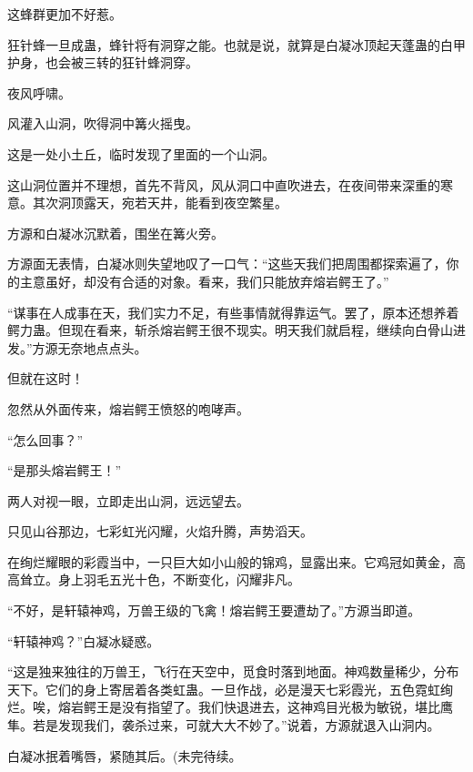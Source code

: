\begin{this_body}
这蜂群更加不好惹。

狂针蜂一旦成蛊，蜂针将有洞穿之能。也就是说，就算是白凝冰顶起天蓬蛊的白甲护身，也会被三转的狂针蜂洞穿。

夜风呼啸。

风灌入山洞，吹得洞中篝火摇曳。

这是一处小土丘，临时发现了里面的一个山洞。

这山洞位置并不理想，首先不背风，风从洞口中直吹进去，在夜间带来深重的寒意。其次洞顶露天，宛若天井，能看到夜空繁星。

方源和白凝冰沉默着，围坐在篝火旁。

方源面无表情，白凝冰则失望地叹了一口气：“这些天我们把周围都探索遍了，你的主意虽好，却没有合适的对象。看来，我们只能放弃熔岩鳄王了。”

“谋事在人成事在天，我们实力不足，有些事情就得靠运气。罢了，原本还想养着鳄力蛊。但现在看来，斩杀熔岩鳄王很不现实。明天我们就启程，继续向白骨山进发。”方源无奈地点点头。

但就在这时！

忽然从外面传来，熔岩鳄王愤怒的咆哮声。

“怎么回事？”

“是那头熔岩鳄王！”

两人对视一眼，立即走出山洞，远远望去。

只见山谷那边，七彩虹光闪耀，火焰升腾，声势滔天。

在绚烂耀眼的彩霞当中，一只巨大如小山般的锦鸡，显露出来。它鸡冠如黄金，高高耸立。身上羽毛五光十色，不断变化，闪耀非凡。

“不好，是轩辕神鸡，万兽王级的飞禽！熔岩鳄王要遭劫了。”方源当即道。

“轩辕神鸡？”白凝冰疑惑。

“这是独来独往的万兽王，飞行在天空中，觅食时落到地面。神鸡数量稀少，分布天下。它们的身上寄居着各类虹蛊。一旦作战，必是漫天七彩霞光，五色霓虹绚烂。唉，熔岩鳄王是没有指望了。我们快退进去，这神鸡目光极为敏锐，堪比鹰隼。若是发现我们，袭杀过来，可就大大不妙了。”说着，方源就退入山洞内。

白凝冰抿着嘴唇，紧随其后。(未完待续。

\end{this_body}

